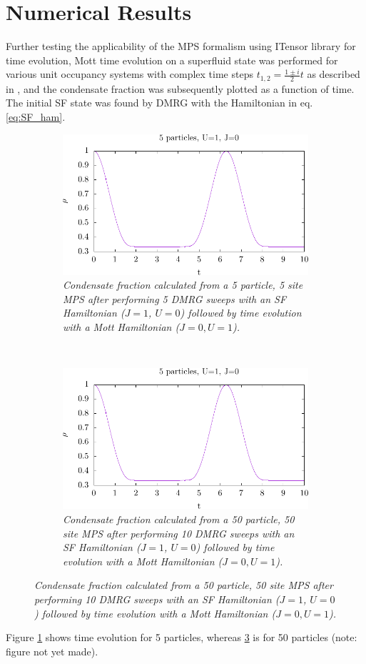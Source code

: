 \section{Numerical Results}
Further testing the applicability of the MPS formalism using ITensor library for time evolution, Mott time evolution on a superfluid state was performed for various unit occupancy systems with complex time steps $t_{1,2}=\frac{1\pm i}{2}t$ as described in \cite{cmplx_t}, and the condensate fraction was subsequently plotted as a function of time. The initial SF state was found by DMRG with the Hamiltonian in eq. \ref{eq:SF_ham}.
\begin{figure}[h!]
    \centering
    \begin{subfigure}[t]{0.49\textwidth}
        \includegraphics[width=\textwidth]{Figures/TimeEvo5_U1_J0.pdf}
        \caption{\textit{Condensate fraction calculated from a 5 particle, 5 site MPS after performing 5 DMRG sweeps with an SF Hamiltonian ($J=1$, $U=0$) followed by time evolution with a Mott Hamiltonian ($J=0, U=1$).}}
        \label{fig:TimeEvo5_U1_J0}
    \end{subfigure}
    ~
    \begin{subfigure}[t]{0.49\textwidth}
        \includegraphics[width=\textwidth]{Figures/TimeEvo50_U1_J0.pdf}
        \caption{\textit{Condensate fraction calculated from a 50 particle, 50 site MPS after performing 10 DMRG sweeps with an SF Hamiltonian ($J=1$, $U=0$) followed by time evolution with a Mott Hamiltonian ($J=0, U=1$).}}
        \label{fig:TimeEvo50_U1_J0}
    \end{subfigure}    
\end{figure}
Figure \ref{fig:TimeEvo5_U1_J0} shows time evolution for 5 particles, whereas \ref{fig:TimeEvo50_U1_J0} is for 50 particles (note: figure not yet made). 

